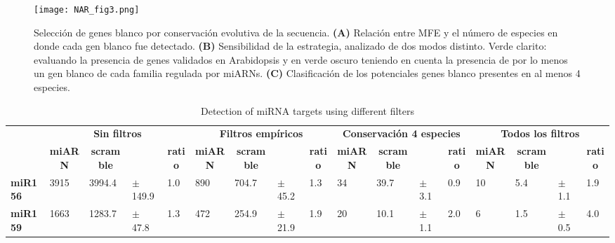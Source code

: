 \begin{figure}[htbp!] 
    \centering    
    \texttt{[image: NAR\_fig3.png]}
    \caption[]{Selección de genes blanco por conservación evolutiva de la secuencia.
    \textbf{(A)} Relación entre MFE y el número de especies en donde cada gen blanco fue detectado.
    \textbf{(B)} Sensibilidad de la estrategia, analizado de dos modos distinto. 
    Verde clarito: evaluando la presencia de genes validados en Arabidopsis y en verde oscuro teniendo en cuenta la presencia de por lo menos un gen blanco de cada familia regulada por miARNs.
    \textbf{(C)} Clasificación de los potenciales genes blanco presentes en al menos 4 especies.}
    \label{fig:NAR_fig3}
\end{figure}



\begin{landscape}
\begin{table}[]
\tiny
\centering
\caption{Detection of miRNA targets using different filters}
\label{table:NAR_table_2}
\begin{tabular}{lllllllllllllllll}
\multicolumn{1}{c}{} & \multicolumn{4}{c}{\textbf{Sin filtros}}                        & \multicolumn{4}{c}{\textbf{Filtros empíricos}}                  & \multicolumn{4}{c}{\textbf{Conservación 4 especies}}            & \multicolumn{4}{c}{\textbf{Todos los filtros}}                  \\
\multicolumn{1}{c}{} & \multicolumn{1}{c}{\textbf{miARN}} & \multicolumn{1}{c}{\textbf{scramble}} & \multicolumn{1}{c}{\textbf{}} & \multicolumn{1}{c}{\textbf{ratio}} & \multicolumn{1}{c}{\textbf{miARN}} & \multicolumn{1}{c}{\textbf{scramble}} & \multicolumn{1}{c}{\textbf{}} & \multicolumn{1}{c}{\textbf{ratio}} & \multicolumn{1}{c}{\textbf{miARN}} & \multicolumn{1}{c}{\textbf{scramble}} & \multicolumn{1}{c}{\textbf{}} & \multicolumn{1}{c}{\textbf{ratio}} & \multicolumn{1}{c}{\textbf{miARN}} & \multicolumn{1}{c}{\textbf{scramble}} & \multicolumn{1}{c}{\textbf{}} & \multicolumn{1}{c}{\textbf{ratio}} \\
\textbf{miR156}      & 3915           & 3994.4            & $\pm$ 149.9     & 1.0            & 890            & 704.7             & $\pm$  45.2      & 1.3            & 34             & 39.7              & $\pm$  3.1       & 0.9            & 10             & 5.4               & $\pm$  1.1       & 1.9            \\
\textbf{miR159}      & 1663           & 1283.7            & $\pm$  47.8      & 1.3            & 472            & 254.9             & $\pm$  21.9      & 1.9            & 20             & 10.1              & $\pm$  1.1       & 2.0            & 6              & 1.5               & $\pm$  0.5       & 4.0            \\

\end{tabular}
\end{table}
\end{landscape}
